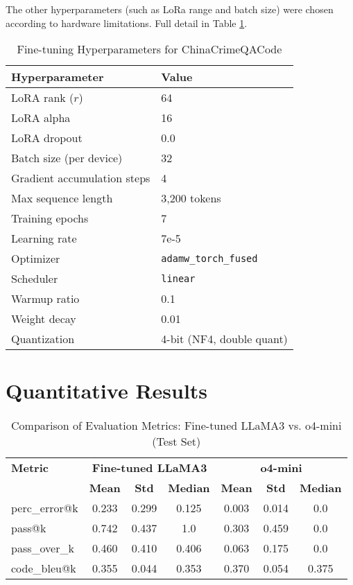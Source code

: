 The other hyperparameters (such as LoRa range and batch size) were chosen according to hardware limitations. Full detail in Table \ref{tab:hyperparameters}.

\begin{table}[H]
\centering
\caption{Fine-tuning Hyperparameters for ChinaCrimeQACode}
\label{tab:hyperparameters}
\begin{tabular}{ll}
\toprule
\textbf{Hyperparameter} & \textbf{Value} \\
\midrule
LoRA rank ($r$) & 64 \\
LoRA alpha & 16 \\
LoRA dropout & 0.0 \\
Batch size (per device) & 32 \\
Gradient accumulation steps & 4 \\
Max sequence length & 3,200 tokens \\
Training epochs & 7 \\
Learning rate & 7e-5 \\
Optimizer & \texttt{adamw\_torch\_fused} \\
Scheduler & \texttt{linear} \\
Warmup ratio & 0.1 \\
Weight decay & 0.01 \\
Quantization & 4-bit (NF4, double quant) \\
\bottomrule
\end{tabular}
\end{table}

\section{Quantitative Results}

\begin{table}[h!]
\centering
\caption{Comparison of Evaluation Metrics: Fine-tuned LLaMA3 vs. o4-mini (Test Set)}
{%
\begin{tabular}{l|ccc|ccc}
\toprule
\textbf{Metric} & \multicolumn{3}{c|}{\textbf{Fine-tuned LLaMA3}} & \multicolumn{3}{c}{\textbf{o4-mini}} \\
\cmidrule(lr){2-4} \cmidrule(lr){5-7}
 & \textbf{Mean} & \textbf{Std} & \textbf{Median} & \textbf{Mean} & \textbf{Std} & \textbf{Median} \\
\midrule
perc\_error@k     & 0.233 & 0.299 & 0.125 & 0.003 & 0.014 & 0.0   \\
pass@k            & 0.742 & 0.437 & 1.0   & 0.303 & 0.459 & 0.0   \\
pass\_over\_k      & 0.460 & 0.410 & 0.406 & 0.063 & 0.175 & 0.0   \\
code\_bleu@k      & 0.355 & 0.044 & 0.353 & 0.370 & 0.054 & 0.375 \\
\bottomrule
\end{tabular}
}
\label{tab:combined_metrics}
\end{table}

